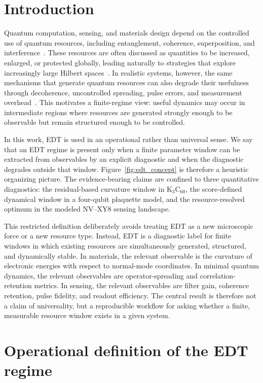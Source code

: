 \documentclass[
  prx,
  reprint,
  superscriptaddress,
  amsmath,
  amssymb,
  aps
]{revtex4-2}
\begin{document}
\section{Introduction}

Quantum computation, sensing, and materials design depend on the controlled use of quantum resources, including entanglement, coherence, superposition, and interference~\cite{NielsenChuang,Horodecki2009,Streltsov2017}. These resources are often discussed as quantities to be increased, enlarged, or protected globally, leading naturally to strategies that explore increasingly large Hilbert spaces~\cite{Preskill2018,Arute2019}. In realistic systems, however, the same mechanisms that generate quantum resources can also degrade their usefulness through decoherence, uncontrolled spreading, pulse errors, and measurement overhead~\cite{Eisert2010,Altman2015}. This motivates a finite-regime view: useful dynamics may occur in intermediate regions where resources are generated strongly enough to be observable but remain structured enough to be controlled.

In this work, EDT is used in an operational rather than universal sense. We say that an EDT regime is present only when a finite parameter window can be extracted from observables by an explicit diagnostic and when the diagnostic degrades outside that window. Figure~\ref{fig:edt_concept} is therefore a heuristic organizing picture. The evidence-bearing claims are confined to three quantitative diagnostics: the residual-based curvature window in K$_3$C$_{60}$, the score-defined dynamical window in a four-qubit plaquette model, and the resource-resolved optimum in the modeled NV--XY8 sensing landscape.

This restricted definition deliberately avoids treating EDT as a new microscopic force or a new resource type. Instead, EDT is a diagnostic label for finite windows in which existing resources are simultaneously generated, structured, and dynamically stable. In materials, the relevant observable is the curvature of electronic energies with respect to normal-mode coordinates. In minimal quantum dynamics, the relevant observables are operator-spreading and correlation-retention metrics. In sensing, the relevant observables are filter gain, coherence retention, pulse fidelity, and readout efficiency. The central result is therefore not a claim of universality, but a reproducible workflow for asking whether a finite, measurable resource window exists in a given system.

\section{Operational definition of the EDT regime}
\end{document}
